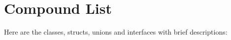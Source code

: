 \section{Compound List}
Here are the classes, structs, unions and interfaces with brief descriptions:\begin{CompactList}
\item{}
\end{CompactList}
